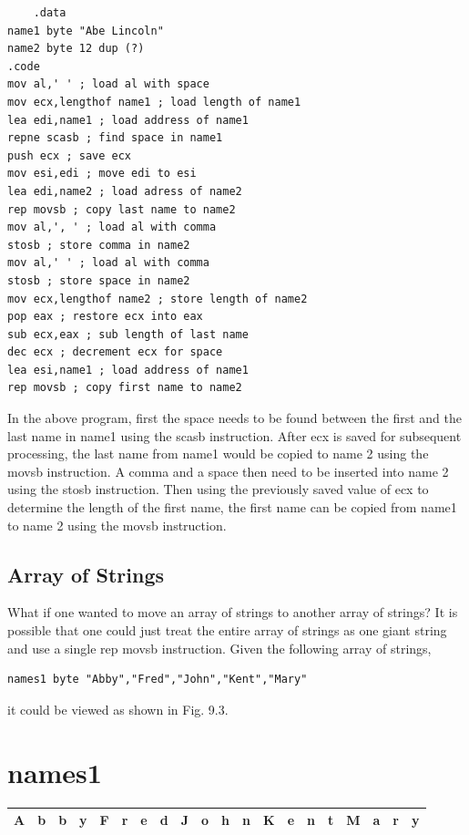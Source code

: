 \documentclass[10pt]{book}
\begin{document}
\begin{verbatim}
    .data
name1 byte "Abe Lincoln"
name2 byte 12 dup (?)
.code
mov al,' ' ; load al with space
mov ecx,lengthof name1 ; load length of name1
lea edi,name1 ; load address of name1
repne scasb ; find space in name1
push ecx ; save ecx
mov esi,edi ; move edi to esi
lea edi,name2 ; load adress of name2
rep movsb ; copy last name to name2
mov al,', ' ; load al with comma
stosb ; store comma in name2
mov al,' ' ; load al with comma
stosb ; store space in name2
mov ecx,lengthof name2 ; store length of name2
pop eax ; restore ecx into eax
sub ecx,eax ; sub length of last name
dec ecx ; decrement ecx for space
lea esi,name1 ; load address of name1
rep movsb ; copy first name to name2
\end{verbatim}

In the above program, first the space needs to be found between the first and the last name in name1 using the scasb instruction. After ecx is saved for subsequent processing, the last name from name1 would be copied to name 2 using the movsb instruction. A comma and a space then need to be inserted into name 2 using the stosb instruction. Then using the previously saved value of ecx to determine the length of the first name, the first name can be copied from name1 to name 2 using the movsb instruction.

\subsection{Array of Strings}
What if one wanted to move an array of strings to another array of strings? It is possible that one could just treat the entire array of strings as one giant string and use a single rep movsb instruction. Given the following array of strings,

\begin{verbatim}
names1 byte "Abby","Fred","John","Kent","Mary"
\end{verbatim}

it could be viewed as shown in Fig. 9.3.

\section{names1}
\begin{center}
\begin{tabular}{|l|l|l|l|l|l|l|l|l|l|l|l|l|l|l|l|l|l|l|l|}
\hline
A & b & b & y & F & r & e & d & J & o & h & n & K & e & n & t & M & a & r & y \\
\hline
\end{tabular}
\end{center}
\end{document}
